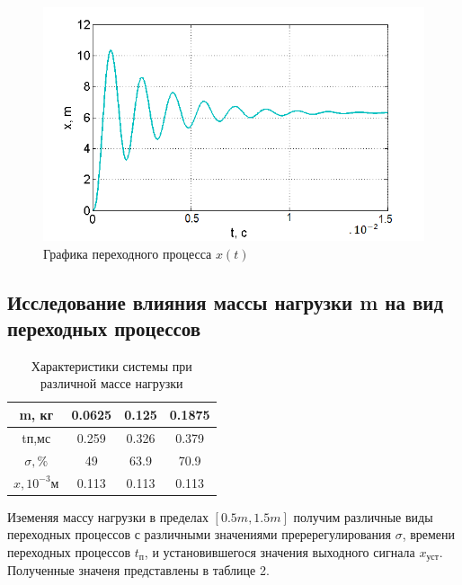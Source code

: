 \documentclass[a4paper, 12pt]{article}
\renewcommand{\arraystretch}{1.5}
\begin{document}
	\begin{figure}[h]
		\centering
		\includegraphics[width=0.8\linewidth]{4}
		\caption{Графика переходного процесса $x(t)$}
		\label{fig:4}
	\end{figure}

\newpage
\begin{center}
	\section{Исследование влияния массы нагрузки m на вид переходных процессов}
\end{center}\par

	\begin{table}[h!]
		\centering
		\begin{threeparttable}
		
	\caption{Характеристики системы при различной массе нагрузки }
	\renewcommand{\arraystretch}{1}
	\renewcommand{\tabcolsep}{0.9cm}
	\begin{tabular}{|c|c|c|c|}
		\hline
		m, кг	&	0.0625	&	0.125	&	0.1875		\\
		\hline
		tп,мс	&	0.259	&	0.326	&	0.379		\\
		\hline
		$\sigma, \%$	&	49	&	63.9	&	70.9		\\
		\hline
		$x,10^{-3}м$	&	0.113	&	0.113	&	0.113		\\
		\hline
	\end{tabular}
\end{threeparttable}
\end{table}

Иземеняя массу нагрузки в пределах $[0.5m, 1.5m]$ получим различные виды переходных процессов с различными значениями преререгулирования $\sigma$, времени переходных процессов $t_\text{п}$, и установившегося значения выходного сигнала $x_\text{уст}$. Полученные значеня представлены в таблице 2.
\end{document}
